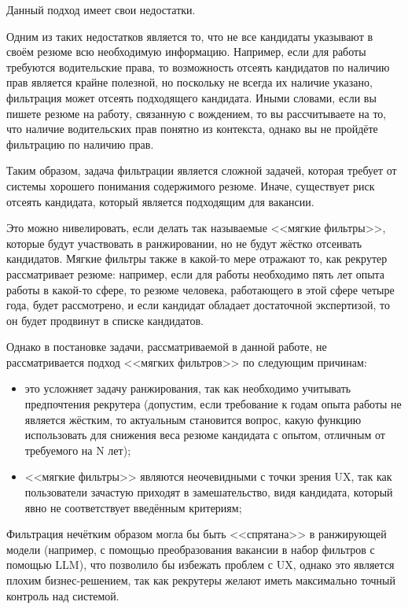 \documentclass[14pt]{mmcs_article}
\begin{document}
Данный подход имеет свои недостатки.

Одним из таких недостатков является то, что не все кандидаты указывают в своём резюме всю необходимую информацию. Например, если для работы требуются водительские права, то возможность отсеять кандидатов по наличию прав является крайне полезной, но поскольку не всегда их наличие указано, фильтрация может отсеять подходящего кандидата. Иными словами, если вы пишете резюме на работу, связанную с вождением, то вы рассчитываете на то, что наличие водительских прав понятно из контекста, однако вы не пройдёте фильтрацию по наличию прав.

Таким образом, задача фильтрации является сложной задачей, которая требует от системы хорошего понимания содержимого резюме. Иначе, существует риск отсеять кандидата, который является подходящим для вакансии.

Это можно нивелировать, если делать так называемые <<мягкие фильтры>>, которые будут участвовать в ранжировании, но не будут жёстко отсеивать кандидатов. Мягкие фильтры также в какой-то мере отражают то, как рекрутер рассматривает резюме: например, если для работы необходимо пять лет опыта работы в какой-то сфере, то резюме человека, работающего в этой сфере четыре года, будет рассмотрено, и если кандидат обладает достаточной экспертизой, то он будет продвинут в списке кандидатов.

Однако в постановке задачи, рассматриваемой в данной работе, не рассматривается подход <<мягких фильтров>> по следующим причинам:

\begin{itemize}
  \item это усложняет задачу ранжирования, так как необходимо учитывать предпочтения рекрутера (допустим, если требование к годам опыта работы не является жёстким, то актуальным становится вопрос, какую функцию использовать для снижения веса резюме кандидата с опытом, отличным от требуемого на N лет);
  \item <<мягкие фильтры>> являются неочевидными с точки зрения UX, так как пользователи зачастую приходят в замешательство, видя кандидата, который явно не соответствует введённым критериям;
\end{itemize}

Фильтрация нечётким образом могла бы быть <<спрятана>> в ранжирующей модели (например, с помощью преобразования вакансии в набор фильтров с помощью LLM), что позволило бы избежать проблем с UX, однако это является плохим бизнес-решением, так как рекрутеры желают иметь максимально точный контроль над системой.
\end{document}
